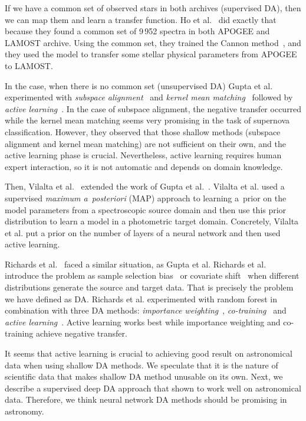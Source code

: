 If we have a common set of observed stars in both archives (supervised DA),
then we can map them and learn a transfer function.
Ho et al.~\cite{ho2017} did exactly that
because they found a common set of 9\,952 spectra in both APOGEE and LAMOST archive.
Using the common set, they trained the Cannon method~\cite{ness2015},
and they used the model to transfer some stellar physical parameters from APOGEE to LAMOST.

In the case, when there is no common set (unsupervised DA)
Gupta et al.~\cite{gupta2016} experimented
with \textit{subspace alignment}~\cite{fernando2014}
and \textit{kernel mean matching}~\cite{gretton2009}
followed by \textit{active learning}~\cite{settles2009}.
In the case of subspace alignment,
the negative transfer occurred
while the kernel mean matching seems very promising in the task of supernova classification.
However, they observed that those shallow methods
(subspace alignment and kernel mean matching) are not sufficient on their own,
and the active learning phase is crucial.
Nevertheless, active learning requires human expert interaction,
so it is not automatic and depends on domain knowledge.

Then, Vilalta et al.~\cite{vilalta2018} extended the work of Gupta et al.~\cite{gupta2016}.
Vilalta et al. used a supervised \textit{maximum a~posteriori} (MAP) approach
to learning a~prior on the model parameters from a spectroscopic source domain
and then use this prior distribution to learn a model in a photometric target domain.
Concretely, Vilalta et al. put a prior on the number of layers of a neural network
and then used active learning.

Richards et al.~\cite{richards2011} faced a similar situation, as Gupta et al.
Richards et al. introduce the problem as sample selection bias~\cite{shimodaira2000} or covariate shift~\cite{heckman1979}
when different distributions generate the source and target data.
That is precisely the problem we have defined as DA.
Richards et al. experimented with random forest in combination with three DA methods:
\textit{importance weighting}~\cite{shimodaira2000},
\textit{co-training}~\cite{blum1998}
and \textit{active learning}~\cite{settles2009}.
Active learning works best while importance weighting and co-training achieve negative transfer.

It seems that active learning is crucial
to achieving good result on astronomical data when using shallow DA methods.
We speculate that it is the nature of scientific data
that makes shallow DA method unusable on its own.
Next, we describe a supervised deep DA  approach
that shown to work well on astronomical data.
Therefore, we think neural network DA methods should be promising in astronomy.

